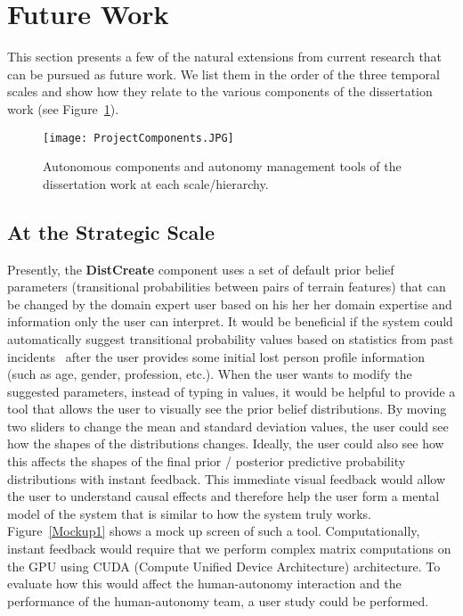 \section{Future Work}
\label{futurework}

This section presents a few of the natural extensions from current research that can be pursued as future work. We list them in the order of the three temporal scales and show how they relate to the various components of the dissertation work (see Figure~\ref{ProjectComponents2}).

\begin{figure}
\centering
\texttt{[image: ProjectComponents.JPG]}
\caption{Autonomous components and autonomy management tools of the dissertation work at each scale/hierarchy.}
\label{ProjectComponents2}
\end{figure}

\subsection{At the Strategic Scale}

Presently, the \textbf{DistCreate} component uses a set of default prior belief parameters (transitional probabilities between pairs of terrain features) that can be changed by the domain expert user based on his her her domain expertise and information only the user can interpret. It would be beneficial if the system could automatically suggest transitional probability values based on statistics from past incidents~\cite{Koester2008Lost} after the user provides some initial lost person profile information (such as age, gender, profession, etc.). When the user wants to modify the suggested parameters, instead of typing in values, it would be helpful to provide a tool that allows the user to visually see the prior belief distributions. By moving two sliders to change the mean and standard deviation values, the user could see how the shapes of the distributions changes. Ideally, the user could also see how this affects the shapes of the final prior / posterior predictive probability distributions with instant feedback. This immediate visual feedback would allow the user to understand causal effects and therefore help the user form a mental model of the system that is similar to how the system truly works. Figure~\ref{Mockup1} shows a mock up screen of such a tool. Computationally, instant feedback would require that we perform complex matrix computations on the GPU using CUDA (Compute Unified Device Architecture) architecture. To evaluate how this would affect the human-autonomy interaction and the performance of the human-autonomy team, a user study could be performed.

